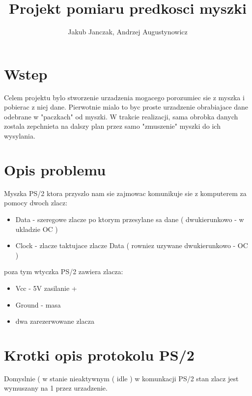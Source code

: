 \documentclass{article}
\author{Jakub Janczak, Andrzej Augustynowicz}
\title{Projekt pomiaru predkosci myszki}
\begin{document}
\maketitle

\section{Wstep}

Celem projektu bylo stworzenie urzadzenia mogacego porozumiec sie z myszka i pobierac z niej dane. Pierwotnie mialo to byc proste urzadzenie obrabiajace dane odebrane w "paczkach" od myszki. W trakcie realizacji, sama obrobka danych zostala zepchnieta na dalszy plan przez samo "zmuszenie" myszki do ich wysylania.

\section{Opis problemu}

Myszka PS/2 ktora przyszlo nam sie zajmowac komunikuje sie z komputerem za pomocy dwoch zlacz: \begin{itemize}
	\item{Data} - szeregowe zlacze po ktorym przesylane sa dane ( dwukierunkowo - w ukladzie OC )
	\item{Clock} - zlacze taktujace zlacze Data ( rowniez uzywane dwukierunkowo - OC )
	\end{itemize}

poza tym wtyczka PS/2 zawiera zlacza:\begin{itemize}
	\item{Vcc} - 5V zasilanie +
	\item{Ground} - masa
	\item{dwa zarezerwowane zlacza}
\end{itemize}

\section{Krotki opis protokolu PS/2}
	Domyslnie ( w stanie nieaktywnym ( idle ) w komunkacji PS/2 stan zlacz jest wymuszany na 1 przez urzadzenie.
\end{document}
